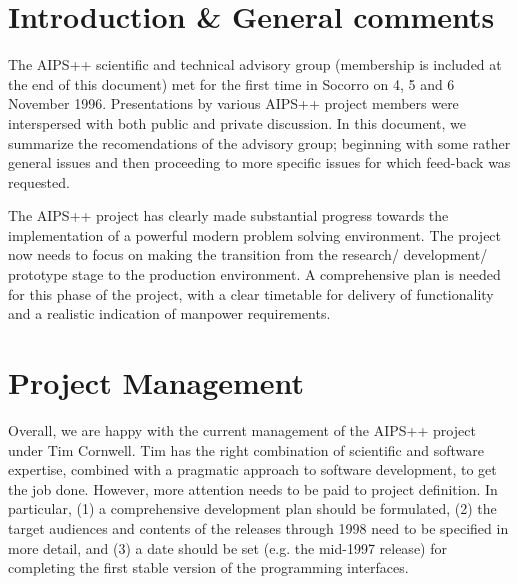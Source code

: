 





\section{Introduction \& General comments}

The AIPS++ scientific and technical advisory group (membership is
included at the end of this document) met for the first time in
Socorro on 4, 5 and 6 November 1996. Presentations by various AIPS++
project members were interspersed with both public and private
discussion. In this document, we summarize the recomendations of the
advisory group; beginning with some rather general issues and then
proceeding to more specific issues for which feed-back was requested.

The AIPS++ project has clearly made substantial progress towards the
implementation of a powerful modern problem solving environment. The project
now needs to focus on making the transition from the
research/ development/ prototype stage to the production environment. A
comprehensive plan is needed for this phase of the project, with a
clear timetable for delivery of functionality and a realistic
indication of manpower requirements.

\section{Project Management}

Overall, we are happy with the current management of the AIPS++
project under Tim Cornwell.  Tim has the right combination of
scientific and software expertise, combined with a pragmatic approach
to software development, to get the job done.  However, more attention
needs to be paid to project definition.  In particular, (1) a
comprehensive development plan should be formulated, (2) the target
audiences and contents of the releases through 1998 need to be specified
in more detail, and (3) a date should be set (e.g. the mid-1997 release)
for completing the first stable version of the programming
interfaces.

